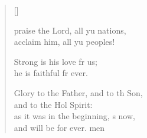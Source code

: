 \settowidth{\versewidth}{Glory to the Father, and to the Son, *}
\begin{verse}[\versewidth]
  \begin{patverse}
     praise the Lord, all yu nations,\Med\\
acclaim him, all yu peoples!

Strong is his love fr us;\Med\\
he is faithful fr ever.

Glory to the Father, and to th Son,\Med\\
and to the Hol Spirit:\\
as it was in the beginning, \pointup{\i}s now,\Med\\
and will be for ever. men
  \end{patverse}
\end{verse}
